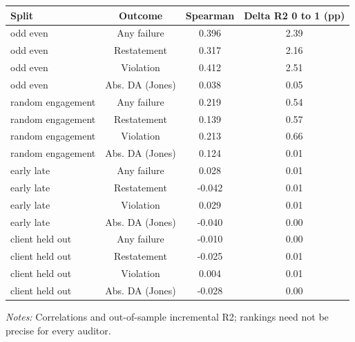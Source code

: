\documentclass[10pt]{article}
\begin{document}
\begin{minipage}{19cm}\fontsize{10}{12}\selectfont\setlength{\tabcolsep}{4pt}\renewcommand{\arraystretch}{1.12}


\centering
{}
\begin{threeparttable}
\begin{tabular}{p{}ccc}
\toprule
Split & Outcome & Spearman & Delta R2 0 to 1 (pp) \\
\midrule
odd even & Any failure & 0.396 & 2.39 \\
odd even & Restatement & 0.317 & 2.16 \\
odd even & Violation & 0.412 & 2.51 \\
odd even & Abs. DA (Jones) & 0.038 & 0.05 \\
random engagement & Any failure & 0.219 & 0.54 \\
random engagement & Restatement & 0.139 & 0.57 \\
random engagement & Violation & 0.213 & 0.66 \\
random engagement & Abs. DA (Jones) & 0.124 & 0.01 \\
early late & Any failure & 0.028 & 0.01 \\
early late & Restatement & -0.042 & 0.01 \\
early late & Violation & 0.029 & 0.01 \\
early late & Abs. DA (Jones) & -0.040 & 0.00 \\
client held out & Any failure & -0.010 & 0.00 \\
client held out & Restatement & -0.025 & 0.01 \\
client held out & Violation & 0.004 & 0.01 \\
client held out & Abs. DA (Jones) & -0.028 & 0.00 \\
\bottomrule
\end{tabular}
\begin{tablenotes}\fontsize{9}{11}\selectfont
\item \raggedright \fontsize{9}{11}\selectfont \textit{Notes:} Correlations and out-of-sample incremental R2; rankings need not be precise for every auditor.
\end{tablenotes}
\end{threeparttable}

\end{minipage}
\end{document}
